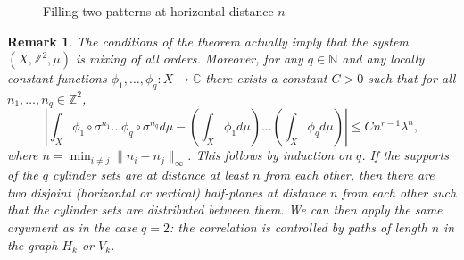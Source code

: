 \documentclass[12pt]{article}
\newtheorem{remark}{Remark}
\theoremstyle{definition}
\def\N{{\mathbb{N}}}
\begin{document}
\begin{figure}\centering
{}
\caption{Filling two patterns at horizontal distance $n$}
\label{fig:filling_squares_overlap}
\end{figure}


\begin{remark}
The conditions of the theorem actually imply that the system $(X,\mathbb{Z}^2,\mu)$ is mixing of all
orders. Moreover, for any $q\in\mathbb{N}$ and any locally constant functions
$\phi_1,\ldots,\phi_q:X\rightarrow\mathbb{C}$ there exists a constant $C>0$ such that
for all $n_1,\ldots,n_q\in\mathbb{Z}^2$,
\[
\left|\int_X \phi_1\circ\sigma^{n_1}\ldots \phi_q\circ\sigma^{n_q}d\mu-
\left(\int_X\phi_1d\mu\right)\ldots \left(\int_X\phi_qd\mu\right) \right|\leq
Cn^{r-1}\lambda^n,
\]
where $n=\min_{i\neq j} \|n_i-n_j\|_\infty$. This follows by induction on $q$. If the supports of the $q$ cylinder sets are at distance at least $n$ from each other, then there are two disjoint (horizontal or vertical) half-planes at distance $n$ from each other such that the cylinder sets are distributed between them. We can then apply the same argument as in the case $q=2$: the correlation is controlled by paths of length $n$ in the graph $H_k$ or $V_k$.
\end{remark}
\end{document}
